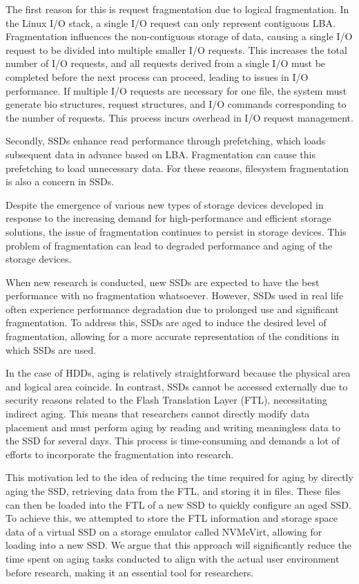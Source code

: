 The first reason for this is request fragmentation due to logical fragmentation.
In the Linux I/O stack, a single I/O request can only represent contiguous LBA.
Fragmentation influences the non-contiguous storage of data, causing a single I/O request to be divided into multiple smaller I/O requests.\cite{IO}
This increases the total number of I/O requests, and all requests derived from a single I/O must be completed before the next process can proceed, leading to issues in I/O performance.
If multiple I/O requests are necessary for one file, the system must generate bio structures, request structures, and I/O commands corresponding to the number of requests.
This process incurs overhead in I/O request management.

Secondly, SSDs enhance read performance through prefetching, which loads subsequent data in advance based on LBA.
Fragmentation can cause this prefetching to load unnecessary data.\cite{defrag-lfs:apsys16} For these reasons, filesystem fragmentation is also a concern in SSDs.


Despite the emergence of various new types of storage devices developed in response to the increasing demand for high-performance and efficient storage solutions, the issue of fragmentation continues to persist in storage devices.
This problem of fragmentation can lead to degraded performance and aging of the storage devices.

When new research is conducted, new SSDs are expected to have the best performance with no fragmentation whatsoever.
However, SSDs used in real life often experience performance degradation due to prolonged use and significant fragmentation.
To address this, SSDs are aged to induce the desired level of fragmentation, allowing for a more accurate representation of the conditions in which SSDs are used.

In the case of HDDs, aging is relatively straightforward because the physical area and logical area coincide.
In contrast, SSDs cannot be accessed externally due to security reasons related to the Flash Translation Layer (FTL), necessitating indirect aging.
This means that researchers cannot directly modify data placement and must perform aging by reading and writing meaningless data to the SSD for several days.
This process is time-consuming and demands a lot of efforts to incorporate the fragmentation into research.

This motivation led to the idea of reducing the time required for aging by directly aging the SSD, retrieving data from the FTL, and storing it in files.
These files can then be loaded into the FTL of a new SSD to quickly configure an aged SSD.
To achieve this, we attempted to store the FTL information and storage space data of a virtual SSD on a storage emulator called NVMeVirt, allowing for loading into a new SSD.
We argue that this approach will significantly reduce the time spent on aging tasks conducted to align with the actual user environment before research, making it an essential tool for researchers.



